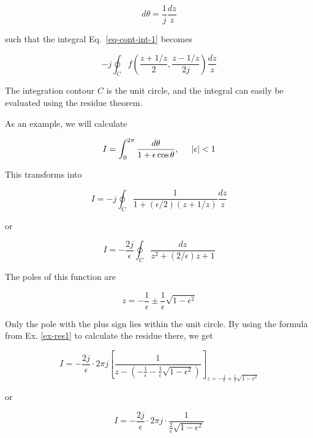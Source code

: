 \begin{equation}
d \theta = \frac{1}{j}\frac{dz}{z}
\end{equation} 

such that the integral Eq.~\ref{eq-cont-int-1} becomes

\begin{equation}
-j \oint_{{C}} f\left(\frac{z + 1/z}{2}, \frac{z - 1/z}{2j}\right)
\frac{dz}{z}
\end{equation} 

The integration contour ${C}$ is the unit circle, and the integral can
easily be evaluated using the residue theorem.

As an example, we will calculate

\begin{equation}
I = \int_0^{2 \pi} \frac{d \theta}{1 + \epsilon \cos \theta}, \hspace{0.5cm}
|\epsilon| < 1
\end{equation} 

This transforms into

\begin{equation}
I = -j \oint_{{C}} \frac{1}{1 + (\epsilon / 2)\left(z + 1/z\right)}
\frac{dz}{z}
\end{equation} 

or

\begin{equation}
I = -\frac{2j}{\epsilon} \oint_{{C}} \frac{dz}{z^2 + (2 / \epsilon)z +
1}
\end{equation} 

The poles of this function are

\begin{equation}
z = - \frac{1}{\epsilon} \pm \frac{1}{\epsilon} \sqrt{1 - \epsilon^2}
\end{equation} 

Only the pole with the plus sign lies within the unit circle. By using the
formula from Ex. \ref{ex-res1} to calculate the residue there, we get

\begin{equation}
I = -\frac{2j}{\epsilon} \cdot 2 \pi j \left[\frac{1}{z - (-\frac{1}{\epsilon} -
\frac{1}{\epsilon} \sqrt{1 - \epsilon^2})}\right]_{z = - \frac{1}{\epsilon} +
\frac{1}{\epsilon} \sqrt{1 - \epsilon^2}}
\end{equation}

or

\begin{equation}
I = -\frac{2j}{\epsilon} \cdot 2 \pi j \cdot \frac{1}{\frac{2}{\epsilon} \sqrt{1
- \epsilon^2}}
\end{equation}

